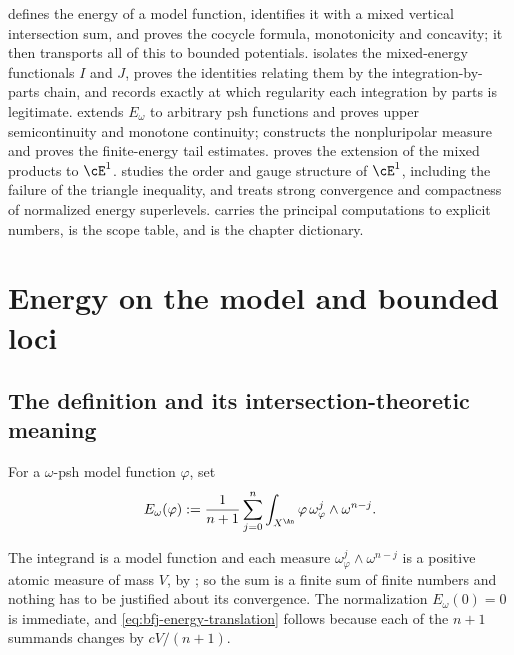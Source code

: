 defines the energy of a model function, identifies
it with a mixed vertical intersection sum, and proves the cocycle formula,
monotonicity and concavity; it then transports all of this to bounded
potentials.   isolates the mixed-energy functionals
$I$ and $J$, proves the identities relating them by the integration-by-parts
chain, and records exactly at which regularity each integration by parts is
legitimate.   extends $E_\omega$ to arbitrary psh
functions and proves upper semicontinuity and monotone continuity;
 constructs the nonpluripolar measure and proves
the finite-energy tail estimates.   proves the
extension of the mixed products to $\cE^1$.  
studies the order and gauge structure of $\cE^1$, including the failure of
the triangle inequality, and  treats strong convergence
and compactness of normalized energy superlevels.   carries the
principal computations to explicit numbers,  is the scope table, and
 is the chapter dictionary.

\section{Energy on the model and bounded loci}
\label{sec:ch26-model-energy}

\subsection{The definition and its intersection-theoretic meaning}
\label{sec:ch26-model-energy-def}

\begin{definition}
\label{def:model-energy}
For a $\omega$-psh model function $\varphi$, set
\begin{equation}
\label{eq:model-energy}
 E_\omega(\varphi)
 :=\frac1{n+1}\sum_{j=0}^n
   \int_{X^{\An}}\varphi\,
   \omega_\varphi^j\wedge\omega^{n-j}.
\end{equation}
\end{definition}

The integrand is a model function and each measure
$\omega_\varphi^j\wedge\omega^{n-j}$ is a positive atomic measure of mass
$V$, by ; so the sum is a finite sum of
finite numbers and nothing has to be justified about its convergence.  The
normalization $E_\omega(0)=0$ is immediate, and
\eqref{eq:bfj-energy-translation} follows because each of the $n+1$
summands changes by $cV/(n+1)$.

